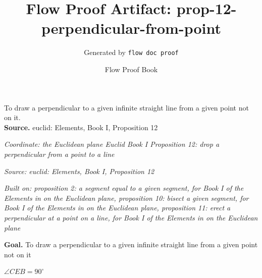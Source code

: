 \documentclass[11pt]{article}
\title{Flow Proof Artifact: prop-12-perpendicular-from-point}
\author{Generated by \texttt{flow doc proof}}
\date{Flow Proof Book}
\theoremstyle{definition}
\begin{document}
\maketitle
To draw a perpendicular to a given infinite straight line from a given point not on it.\\[0.5em]
\textbf{Source.} euclid: Elements, Book I, Proposition 12\\[0.5em]
\bigskip
{}\par
\smallskip\noindent\textit{Coordinate: the Euclidean plane \cdot Euclid Book I \cdot Proposition 12: drop a perpendicular from a point to a line}\par
\smallskip\noindent\textit{Source: euclid: Elements, Book I, Proposition 12}\par
\smallskip\noindent\textit{Built on: proposition 2: a segment equal to a given segment, for Book I of the Elements in on the Euclidean plane, proposition 10: bisect a given segment, for Book I of the Elements in on the Euclidean plane, proposition 11: erect a perpendicular at a point on a line, for Book I of the Elements in on the Euclidean plane}\par
\medskip
\noindent\textbf{Goal.} To draw a perpendicular to a given infinite straight line from a given point not on it\par
\noindent$\displaystyle \angle CEB = 90^\circ$\par
\medskip
\noindent
\end{document}
